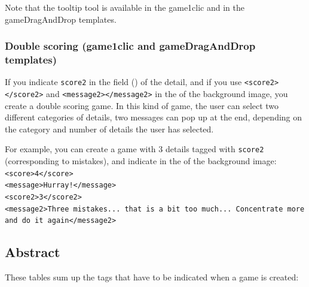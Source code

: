 Note that the tooltip tool is available in the game1clic and in the gameDragAndDrop templates.\\
 

\subsubsection{Double scoring (game1clic and gameDragAndDrop templates)}

If you indicate \verb|score2| in the  field
() of the detail,
and if you use \texttt{<score2></score2>} and  \texttt{<message2></message2>} 
in the  of the 
background image, you create a double scoring game. In this kind of game, the
user can select two different categories of details, 
two messages can pop up at the end, depending on the category and number
of details the user has selected.

For example, you can create a game with 3 details tagged with \texttt{score2}
(corresponding to mistakes), and indicate in the 
of the background image:\\
\texttt{<score>4</score>\\
<message>Hurray!</message>\\
<score2>3</score2>\\
<message2>Three mistakes... that is a bit too much... Concentrate more and do it again</message2>}\\

\newpage
\subsection{Abstract}

These tables sum up the tags that have to be indicated when a game is created:


